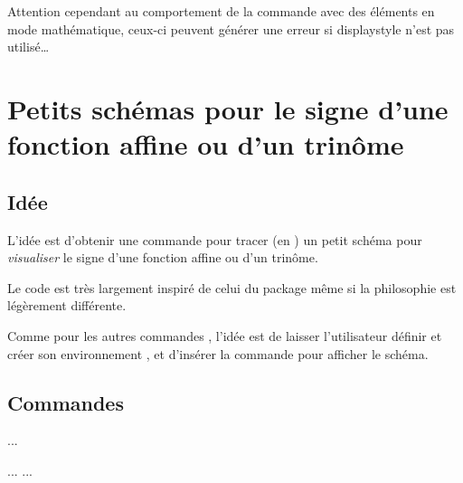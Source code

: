 \documentclass{article}
\newcommand\ctex[1]{\tcbox[vignettelatex]{#1}}
\begin{document}
\begin{codeinfo}
Attention cependant au comportement de la commande avec des éléments en mode \textsf{mathématique}, ceux-ci peuvent générer une erreur si \textsf{displaystyle} n'est pas utilisé\ldots
\end{codeinfo}

\newpage

\section{Petits schémas pour le signe d'une fonction affine ou d'un trinôme}\label{aidesigne}

\subsection{Idée}

\begin{codeidee}
L'idée est d'obtenir une commande pour tracer (en \TikZ) un petit schéma pour \textit{visualiser} le signe d'une fonction affine ou d'un trinôme.

Le code est très largement inspiré de celui du package \ctex{tnsana} même si la philosophie est légèrement différente.

\smallskip

Comme pour les autres commandes \TikZ, l'idée est de laisser l'utilisateur définir et créer son environnement \TikZ, et d'insérer la commande \ctex{aidesignePL} pour afficher le schéma.
\end{codeidee}

\begin{codetex}
\aidesignePL
\end{codetex}

\subsection{Commandes}

\begin{codetex}
...
\end{codetex}

\begin{codetex}
... {\tikz[<options>] \aidesignePL[<clés>]}...
\end{codetex}
\end{document}
